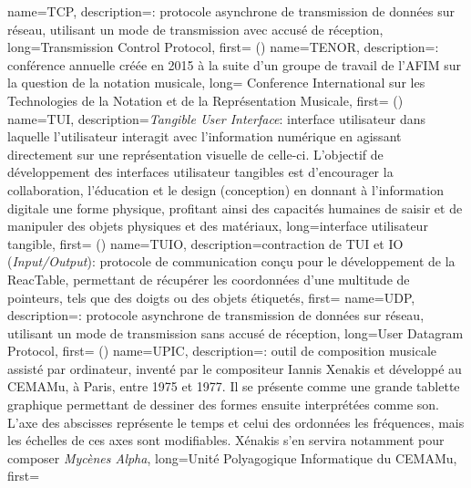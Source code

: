 {
    name={TCP},
    description={\textit{}: protocole asynchrone de transmission de données sur réseau, utilisant un mode de transmission avec accusé de réception},
    long={Transmission Control Protocol},
    first={ ()}
}
{
    name={TENOR},
    description={\textit{}: conférence annuelle créée en 2015 à la suite d'un groupe de travail de l'\gls{AFIM} sur la question de la notation musicale},
    long= {Conference International sur les Technologies de la Notation et de la Représentation Musicale},
    first={ ()}
}
{
    name={TUI},
    description={\textit{Tangible User Interface}: interface utilisateur dans laquelle l'utilisateur interagit avec l'information numérique en agissant directement sur une représentation visuelle de celle-ci. L'objectif de développement des interfaces utilisateur tangibles est d'encourager la collaboration, l'éducation et le design (conception) en donnant à l'information digitale une forme physique, profitant ainsi des capacités humaines de saisir et de manipuler des objets physiques et des matériaux},
    long={interface utilisateur tangible},
    first={ ()}
}
{
    name={TUIO},
    description={contraction de \gls{TUI} et IO (\textit{Input/Output}): protocole de communication conçu pour le développement de la ReacTable, permettant de récupérer les coordonnées d'une multitude de pointeurs, tels que des doigts ou des objets étiquetés},
    first={}
}
{
    name={UDP},
    description={\textit{}: protocole asynchrone de transmission de données sur réseau, utilisant un mode de transmission sans accusé de réception},
    long={User Datagram Protocol},
    first={ ()}
}
{
    name={UPIC},
    description={\textit{}: outil de composition musicale assisté par ordinateur, inventé par le compositeur Iannis Xenakis et développé au \gls{CEMAMu}, à Paris, entre 1975 et 1977. Il se présente comme une grande tablette graphique permettant de dessiner des formes ensuite interprétées comme son. L'axe des abscisses représente le temps et celui des ordonnées les fréquences, mais les échelles de ces axes sont modifiables. Xénakis s'en servira notamment pour composer \textit{Mycènes Alpha}},
    long={Unité Polyagogique Informatique du CEMAMu},
    first={}
}
